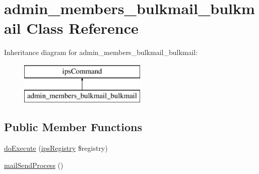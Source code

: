 \hypertarget{classadmin__members__bulkmail__bulkmail}{\section{admin\-\_\-members\-\_\-bulkmail\-\_\-bulkmail Class Reference}
\label{classadmin__members__bulkmail__bulkmail}
}
Inheritance diagram for admin\-\_\-members\-\_\-bulkmail\-\_\-bulkmail\-:\begin{figure}[H]
\begin{center}
\leavevmode
\includegraphics[height=2.000000cm]{classadmin__members__bulkmail__bulkmail}
\end{center}
\end{figure}
\subsection*{Public Member Functions}
\begin{DoxyCompactItemize}
\item 
\hyperlink{classadmin__members__bulkmail__bulkmail_afbc4e912a0604b94d47d66744c64d8ba}{do\-Execute} (\hyperlink{classips_registry}{ips\-Registry} \$registry)
\item 
\hyperlink{classadmin__members__bulkmail__bulkmail_a92d3cac4bca20f16776a67e2e15acf41}{mail\-Send\-Process} ()
\end{DoxyCompactItemize}
